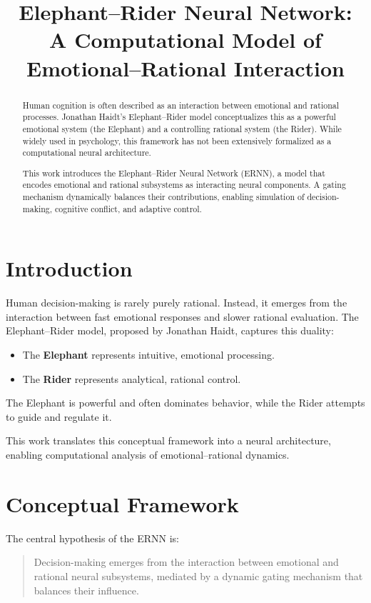 \documentclass[12pt]{article}
\title{\textbf{Elephant–Rider Neural Network: \\ A Computational Model of Emotional–Rational Interaction}}
\author{}
\date{}
\begin{document}
\maketitle

\begin{abstract}
Human cognition is often described as an interaction between emotional and rational processes. Jonathan Haidt's Elephant–Rider model conceptualizes this as a powerful emotional system (the Elephant) and a controlling rational system (the Rider). While widely used in psychology, this framework has not been extensively formalized as a computational neural architecture.

This work introduces the Elephant–Rider Neural Network (ERNN), a model that encodes emotional and rational subsystems as interacting neural components. A gating mechanism dynamically balances their contributions, enabling simulation of decision-making, cognitive conflict, and adaptive control.
\end{abstract}

\section{Introduction}

Human decision-making is rarely purely rational. Instead, it emerges from the interaction between fast emotional responses and slower rational evaluation. The Elephant–Rider model, proposed by Jonathan Haidt, captures this duality:

\begin{itemize}
\item The \textbf{Elephant} represents intuitive, emotional processing.
\item The \textbf{Rider} represents analytical, rational control.
\end{itemize}

The Elephant is powerful and often dominates behavior, while the Rider attempts to guide and regulate it.

This work translates this conceptual framework into a neural architecture, enabling computational analysis of emotional–rational dynamics.

\section{Conceptual Framework}

The central hypothesis of the ERNN is:

\begin{quote}
Decision-making emerges from the interaction between emotional and rational neural subsystems, mediated by a dynamic gating mechanism that balances their influence.
\end{quote}
\end{document}
